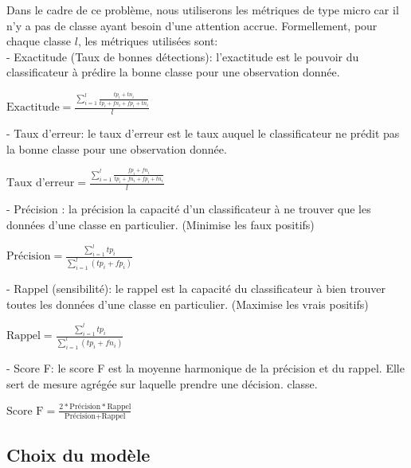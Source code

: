 Dans le cadre de ce problème, nous utiliserons les métriques de type micro car il n'y a pas de classe ayant besoin d'une attention accrue. Formellement, pour chaque classe $l$, les métriques utilisées sont: \\

- Exactitude (Taux de bonnes détections): l'exactitude est le pouvoir du classificateur à prédire la bonne classe pour une observation donnée.\\
\begin{center}
	$\textrm{Exactitude} = \frac{\sum_{i=1}^{l} \frac{tp_i +tn_i}{tp_i + fn_i + fp_i+ tn_i}}{l}$
\end{center}
	
- Taux d'erreur: le taux d'erreur est le taux auquel le classificateur ne prédit pas la bonne classe pour une observation donnée.\\ 
\begin{center}
	$\textrm{Taux d'erreur} = \frac{\sum_{i=1}^{l} \frac{fp_i +fn_i}{tp_i + fn_i + fp_i+ tn_i}}{l}$
\end{center}

- Précision : la précision la capacité d'un classificateur à ne trouver que les données d'une classe en particulier. (Minimise les faux positifs) \\
\begin{center}
	$\textrm{Précision} = \frac{\sum_{i=1}^{l} tp_i}{\sum_{i=1}^{l} (tp_i + fp_i)}$
\end{center}

- Rappel (sensibilité): le rappel est la capacité du classificateur à bien trouver toutes les données d'une classe en particulier. (Maximise les vrais positifs)\\
\begin{center}
	$\textrm{Rappel} = \frac{\sum_{i=1}^{l} tp_i}{\sum_{i=1}^{l} (tp_i + fn_i)}$
\end{center}

- Score F: le score F est la moyenne harmonique de la précision et du rappel. Elle sert de mesure agrégée sur laquelle prendre une décision. classe.\\	
\begin{center}
	$\textrm{Score F} = \frac{2 * \textrm{Précision} * \textrm{Rappel}}{\textrm{Précision} + \textrm{Rappel}}$ 
\end{center}

\subsection{Choix du modèle}

